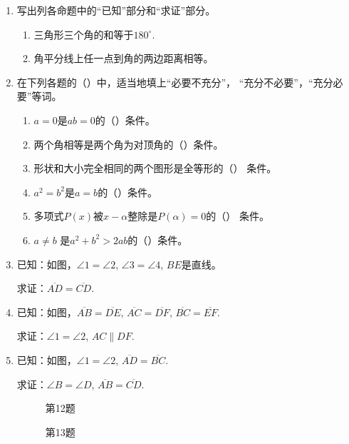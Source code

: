 \begin{enumerate}
\item 写出列各命题中的“已知”部分和“求证”部分。
\begin{enumerate}
	\item 三角形三个角的和等于$180^{\circ}$.
	\item 角平分线上任一点到角的两边距离相等。
\end{enumerate}

\item 在下列各题的（\qquad）中，适当地填上“必要不充分”，
“充分不必要”，“充分必要”等词。
\begin{enumerate}
	\item $a=0$是$ab=0$的（\qquad）条件。
	\item 两个角相等是两个角为对顶角的（\qquad）条件。
	\item 形状和大小完全相同的两个图形是全等形的（\qquad）
	条件。
	\item $a^2=b^2$是$a=b$的（\qquad）条件。
	\item 多项式$P(x)$被$x-\alpha$整除是$P(\alpha)=0$的（\qquad）
	条件。
	\item $a\ne b$ 是$a^2+b^2>2ab$的（\qquad）条件。
\end{enumerate}

\item 已知：如图，$\angle 1=\angle 2$, $\angle 3=\angle 4$, $BE$是直线。

求证：$\overline{AD}=\overline{CD}$.

\item 已知：如图，$\overline{AB}=\overline{DE}$, $\overline{AC}=\overline{DF}$, $\overline{BC}=\overline{EF}$.

求证：$\angle 1=\angle 2$, $AC\parallel DF$.
\item 已知：如图，$\angle 1=\angle 2$, $\overline{AD}=\overline{BC}$.

求证：$\angle B=\angle D$, $\overline{AB}=\overline{CD}$.

\begin{figure}[htp]\centering
    \begin{minipage}[t]{0.48\textwidth}
    \centering
{}
	\caption*{第12题}
    \end{minipage}
    \begin{minipage}[t]{0.48\textwidth}
    \centering
	\caption*{第13题}
    \end{minipage}
    \end{figure}


\end{enumerate}
